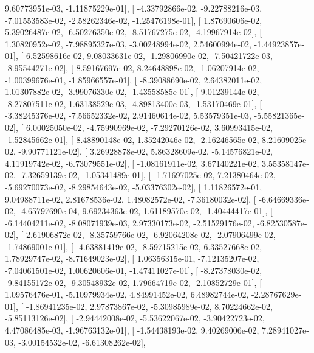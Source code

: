 \documentclass{article}
\begin{document}
          9.60773951e-03,  -1.11875229e-01],
       [ -4.33792866e-02,  -9.22788216e-03,  -7.01553583e-02,
         -2.58262346e-02,  -1.25476198e-01],
       [  1.87690606e-02,   5.39026487e-02,  -6.50276350e-02,
         -8.51767275e-02,  -4.19967914e-02],
       [  1.30820952e-02,  -7.98895327e-03,  -3.00248994e-02,
          2.54600994e-02,  -1.44923857e-01],
       [  6.52598616e-02,   9.08033631e-02,  -1.29806990e-02,
         -7.50421722e-03,  -8.95544271e-02],
       [  8.59167697e-02,   8.24648898e-02,  -1.06207914e-02,
         -1.00399676e-01,  -1.85966557e-01],
       [ -8.39088690e-02,   2.64382011e-02,   1.01307882e-02,
         -3.99076330e-02,  -1.43558585e-01],
       [  9.01239144e-02,  -8.27807511e-02,   1.63138529e-03,
         -4.89813400e-03,  -1.53170469e-01],
       [ -3.38245376e-02,  -7.56652332e-02,   2.91460614e-02,
          5.53579351e-03,  -5.55821365e-02],
       [  6.00025050e-02,  -4.75990969e-02,  -7.29270126e-02,
          3.60993415e-02,  -1.52845662e-01],
       [  8.48890148e-02,   1.35242046e-02,  -2.16246565e-02,
          8.21609025e-02,  -9.90771121e-02],
       [  3.26928878e-02,   5.86328609e-02,  -5.14576821e-02,
          4.11919742e-02,  -6.73079551e-02],
       [ -1.08161911e-02,   3.67140221e-02,   3.55358147e-02,
         -7.32659139e-02,  -1.05341489e-01],
       [ -1.71697025e-02,   7.21380464e-02,  -5.69270073e-02,
         -8.29854643e-02,  -5.03376302e-02],
       [  1.11826572e-01,   9.04988711e-02,   2.81678536e-02,
          1.48082572e-02,  -7.36180032e-02],
       [ -6.64669336e-02,  -4.65797690e-04,   9.69234363e-02,
          1.61189570e-02,  -1.40444417e-01],
       [ -6.14404211e-02,  -8.08071939e-03,   2.97330173e-02,
         -2.51529176e-02,  -6.82530587e-02],
       [  2.61906872e-02,  -8.35759766e-02,  -6.92064208e-02,
         -2.07906499e-02,  -1.74869001e-01],
       [ -4.63881419e-02,  -8.59715215e-02,   6.33527668e-02,
          1.78929747e-02,  -8.71649023e-02],
       [  1.06356315e-01,  -7.12135207e-02,  -7.04061501e-02,
          1.00620606e-01,  -1.47411027e-01],
       [ -8.27378030e-02,  -9.84155172e-02,  -9.30548932e-02,
          1.79664719e-02,  -2.10852729e-01],
       [  1.09576476e-01,  -5.10979934e-02,   4.84991452e-02,
          6.48982744e-02,  -2.28767629e-01],
       [ -1.86941235e-02,   2.97873867e-02,  -5.30985989e-02,
          8.70224662e-02,  -5.85113126e-02],
       [ -2.94442008e-02,  -5.53622067e-02,  -3.90422723e-02,
          4.47086485e-03,  -1.96763132e-01],
       [ -1.54438193e-02,   9.40269006e-02,   7.28941027e-03,
         -3.00154532e-02,  -6.61308262e-02],
\end{document}

